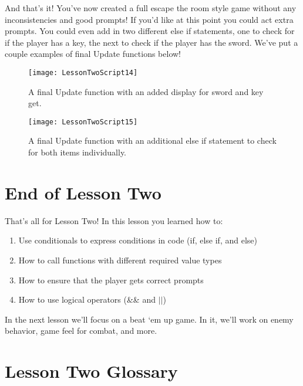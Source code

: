 \documentclass{article}
\begin{document}
{And that's it! You've now created a full escape the room style game without any inconsistencies and good prompts! If you'd like at this point you could act extra prompts. You could even add in two different else if statements, one to check for if the player has a key, the next to check if the player has the sword. We've put a couple examples of final Update functions below! 
 
  \begin{figure}
  \texttt{[image: LessonTwoScript14]}
  \caption{A final Update function with an added display for sword and key get.}
  \label{fig:LessonTwoScript14}
\end{figure}

 \begin{figure}
  \texttt{[image: LessonTwoScript15]}
  \caption{A final Update function with an additional else if statement to check for both items individually.}
  \label{fig:LessonTwoScript15}
\end{figure}
 
  \noindent{} 
 
\section{End of Lesson Two}

That's all for Lesson Two! In this lesson you learned how to:

\begin{enumerate}
 \item Use conditionals to express conditions in code (if, else if, and else)
 \item How to call functions with different required value types
 \item How to ensure that the player gets correct prompts
 \item How to use logical operators (\&\& and $||$)
\end{enumerate}

In the next lesson we'll focus on a beat `em up game. In it, we'll work on enemy behavior, game feel for combat, and more.

\section{Lesson Two Glossary}

}
\end{document}
